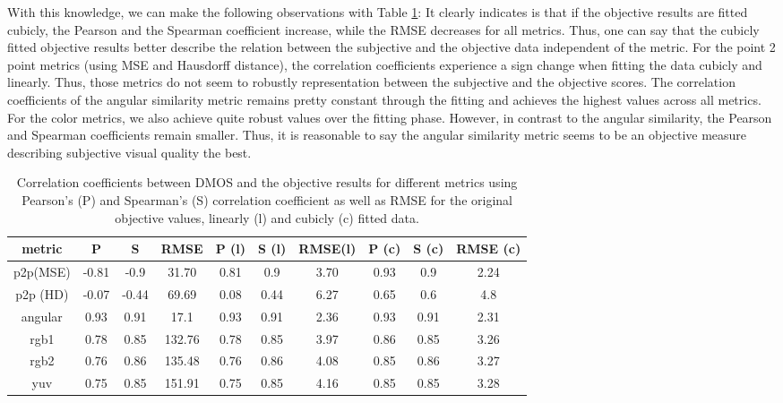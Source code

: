 \documentclass{article}
\begin{document}
With this knowledge, we can make the following observations with Table \ref{tab:1}: It clearly indicates is that if the objective results are fitted cubicly, the Pearson and the Spearman coefficient increase, while the RMSE decreases for all metrics. Thus, one can say that the cubicly fitted objective results better describe the relation between the subjective and the objective data independent of the metric. For the point 2 point metrics (using MSE and Hausdorff distance), the correlation coefficients experience a sign change when fitting the data cubicly and linearly. Thus, those metrics do not seem to robustly representation between the subjective and the objective scores. The correlation coefficients of the angular similarity metric remains pretty constant through the fitting and achieves the highest values across all metrics. For the color metrics, we also achieve quite robust values over the fitting phase. However, in contrast to the angular similarity, the Pearson and Spearman coefficients remain smaller. Thus, it is reasonable to say the angular similarity metric seems to be an objective measure describing subjective visual quality the best. 


\begin{table}[t]
\caption{Correlation coefficients between DMOS and the objective results for different metrics using Pearson's (P) and Spearman's (S) correlation coefficient as well as RMSE for the original objective values, linearly (l) and cubicly (c) fitted data.}
\label{tab:1}
\begin{tabular}{c | c c c c c c c c c}
metric & P & S & RMSE & P (l) & S (l) & RMSE(l) & P (c) & S (c) & RMSE (c) \\
\hline
p2p(MSE) & -0.81 & -0.9 &	31.70 &	0.81 &	0.9	& 3.70 & 0.93 &	0.9 &	2.24 \\
p2p (HD) & -0.07 & -0.44 & 69.69 & 0.08 &	0.44 &	6.27 &	0.65 &	0.6 &	4.8 \\
angular & 0.93 & 0.91 &	17.1 &	0.93 &	0.91 &	2.36 &	0.93 &	0.91 &	2.31 \\
rgb1 & 0.78 &	0.85 &	132.76 & 0.78 &	0.85 &	3.97 &	0.86 &	0.85 &	3.26 \\
rgb2 & 0.76 &	0.86 &	135.48 & 0.76 &	0.86 &	4.08 &	0.85 &	0.86 &	3.27 \\
yuv & 0.75 &	0.85 &	151.91 & 0.75 &	0.85 &	4.16 &	0.85 &	0.85 &	3.28
\end{tabular}
\end{table}
\end{document}
